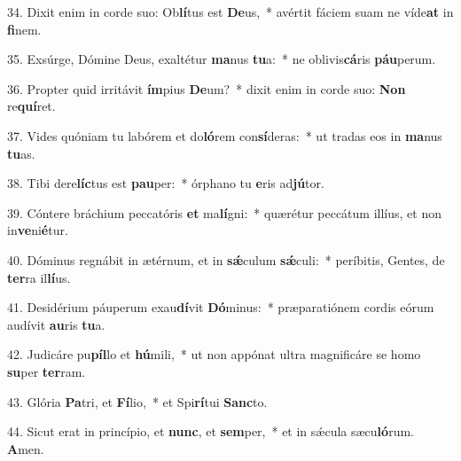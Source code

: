 34. Dixit enim in corde suo: Ob\textbf{lí}tus est \textbf{De}us,~*  avértit fáciem suam ne víde\textbf{at} in \textbf{fi}nem.\

35. Exsúrge, Dómine Deus, exaltétur \textbf{ma}nus \textbf{tu}a:~*  ne oblivis\textbf{cá}ris \textbf{páu}perum.\

36. Propter quid irritávit \textbf{ím}pius \textbf{De}um?~*  dixit enim in corde suo: \textbf{Non} re\textbf{quí}ret.\

37. Vides quóniam tu labórem et do\textbf{ló}rem con\textbf{sí}deras:~*  ut tradas eos in \textbf{ma}nus \textbf{tu}as.\

38. Tibi dere\textbf{líc}tus est \textbf{pau}per:~*  órphano tu \textbf{e}ris ad\textbf{jú}tor.\

39. Cóntere bráchium peccatóris \textbf{et} ma\textbf{lí}gni:~*  quærétur peccátum illíus, et non in\textbf{ve}ni\textbf{é}tur.\

40. Dóminus regnábit in ætérnum, et in \textbf{sǽ}culum \textbf{sǽ}culi:~*  períbitis, Gentes, de \textbf{ter}ra il\textbf{lí}us.\

41. Desidérium páuperum exau\textbf{dí}vit \textbf{Dó}minus:~*  præparatiónem cordis eórum audívit \textbf{au}ris \textbf{tu}a.\

42. Judicáre pu\textbf{píl}lo et \textbf{hú}mili,~*  ut non appónat ultra magnificáre se homo \textbf{su}per \textbf{ter}ram.\

43. Glória \textbf{Pa}tri, et \textbf{Fí}lio,~*  et Spi\textbf{rí}tui \textbf{Sanc}to.\

44. Sicut erat in princípio, et \textbf{nunc}, et \textbf{sem}per,~*  et in sǽcula sæcu\textbf{ló}rum. \textbf{A}men.\

